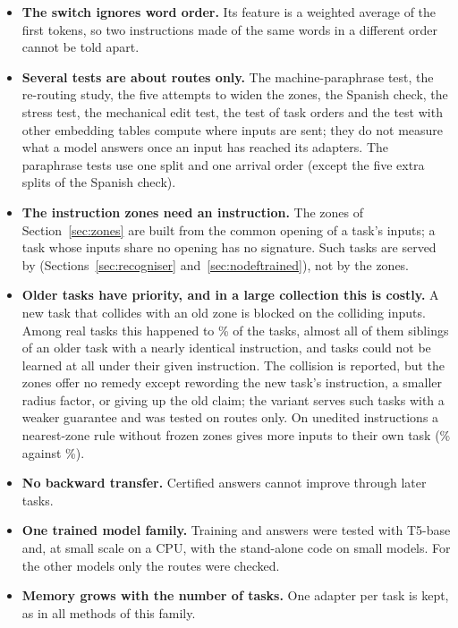 \begin{itemize}
  typos in the instruction leave only 45\% of the inputs on their own task, and tasks with very
  short instructions lose their route after a few edits. The method flags these inputs; it does not
  rescue them.
  \item \textbf{The switch ignores word order.} Its feature is a weighted average of the first
  tokens, so two instructions made of the same words in a different order cannot be told apart.
  \item \textbf{Several tests are about routes only.} The machine-paraphrase test, the re-routing study, the five attempts to widen the zones, the Spanish check, the stress test, the mechanical edit test, the test of task orders and the test with other embedding tables compute where inputs are sent; they do not measure what a model answers once an input has reached its adapters. The paraphrase tests use one split and one arrival order (except the five extra splits of the Spanish check).
  \item \textbf{The instruction zones need an instruction.} The zones of Section~\ref{sec:zones} are
  built from the common opening of a task's inputs; a task whose inputs share no opening has no
  signature. Such tasks are served by \recog{} (Sections~\ref{sec:recogniser}
  and~\ref{sec:nodeftrained}), not by the zones.
  \item \textbf{Older tasks have priority, and in a large collection this is costly.} A new task
  that collides with an old zone is blocked on the colliding inputs. Among \ManyTasks{} real tasks
  this happened to \ManyCollidingPct{}\% of the tasks, almost all of them siblings of an older task
  with a nearly identical instruction, and \ManyAllHeld{} tasks could not be learned at all under
  their given instruction. The collision is reported, but the zones offer no remedy except
  rewording the new task's instruction, a smaller radius factor, or giving up the old claim; the
  variant \exactfirst{} serves such tasks with a weaker guarantee and was tested on routes only. On
  unedited instructions a nearest-zone rule without frozen zones gives more inputs to their own
  task (\ManyNearRightPct{}\% against \ManyCertRightPct{}\%).
  \item \textbf{No backward transfer.} Certified answers cannot improve through later tasks.
  \item \textbf{One trained model family.} Training and answers were tested with T5-base and, at
  small scale on a CPU, with the stand-alone code on small models. For the other models only the
  routes were checked.
  \item \textbf{Memory grows with the number of tasks.} One adapter per task is kept, as in all
  methods of this family.
\end{itemize}

